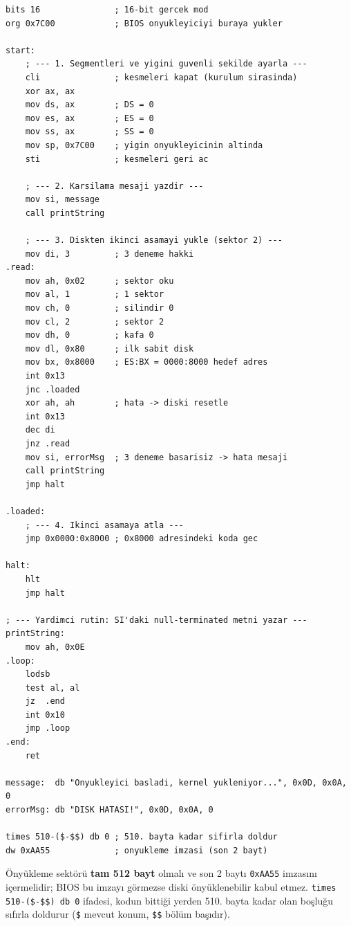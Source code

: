 \documentclass[11pt,a4paper]{article}
\newcommand{\hx}[1]{\texttt{\color{turuncu}#1}}
\newcommand{\kod}[1]{\texttt{\color{koyuGri}#1}}
\begin{document}
\begin{lstlisting}
bits 16               ; 16-bit gercek mod
org 0x7C00            ; BIOS onyukleyiciyi buraya yukler

start:
    ; --- 1. Segmentleri ve yigini guvenli sekilde ayarla ---
    cli               ; kesmeleri kapat (kurulum sirasinda)
    xor ax, ax
    mov ds, ax        ; DS = 0
    mov es, ax        ; ES = 0
    mov ss, ax        ; SS = 0
    mov sp, 0x7C00    ; yigin onyukleyicinin altinda
    sti               ; kesmeleri geri ac

    ; --- 2. Karsilama mesaji yazdir ---
    mov si, message
    call printString

    ; --- 3. Diskten ikinci asamayi yukle (sektor 2) ---
    mov di, 3         ; 3 deneme hakki
.read:
    mov ah, 0x02      ; sektor oku
    mov al, 1         ; 1 sektor
    mov ch, 0         ; silindir 0
    mov cl, 2         ; sektor 2
    mov dh, 0         ; kafa 0
    mov dl, 0x80      ; ilk sabit disk
    mov bx, 0x8000    ; ES:BX = 0000:8000 hedef adres
    int 0x13
    jnc .loaded
    xor ah, ah        ; hata -> diski resetle
    int 0x13
    dec di
    jnz .read
    mov si, errorMsg  ; 3 deneme basarisiz -> hata mesaji
    call printString
    jmp halt

.loaded:
    ; --- 4. Ikinci asamaya atla ---
    jmp 0x0000:0x8000 ; 0x8000 adresindeki koda gec

halt:
    hlt
    jmp halt

; --- Yardimci rutin: SI'daki null-terminated metni yazar ---
printString:
    mov ah, 0x0E
.loop:
    lodsb
    test al, al
    jz  .end
    int 0x10
    jmp .loop
.end:
    ret

message:  db "Onyukleyici basladi, kernel yukleniyor...", 0x0D, 0x0A, 0
errorMsg: db "DISK HATASI!", 0x0D, 0x0A, 0

times 510-($-$$) db 0 ; 510. bayta kadar sifirla doldur
dw 0xAA55             ; onyukleme imzasi (son 2 bayt)
\end{lstlisting}

\begin{notkutu}
Önyükleme sektörü \textbf{tam 512 bayt} olmalı ve son 2 baytı \hx{0xAA55}
imzasını içermelidir; BIOS bu imzayı görmezse diski önyüklenebilir kabul etmez.
\kod{times 510-(\$-\$\$) db 0} ifadesi, kodun bittiği yerden 510. bayta kadar
olan boşluğu sıfırla doldurur (\kod{\$} mevcut konum, \kod{\$\$} bölüm başıdır).
\end{notkutu}

\end{document}
